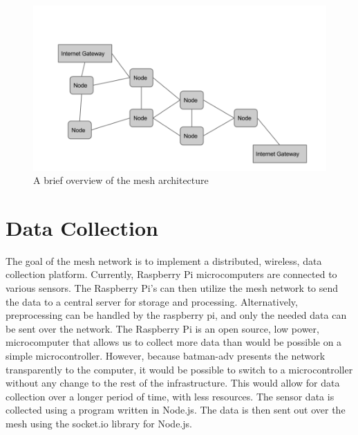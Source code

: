 \documentclass{IEEEtran}
\begin{document}
\begin{figure}
	\includegraphics[width=\textwidth]{nodearchitecture}
	\caption{A brief overview of the mesh architecture}
\end{figure}
\section{Data Collection}
The goal of the mesh network is to implement a distributed, wireless, data collection platform. Currently, Raspberry Pi microcomputers are connected to various sensors. The Raspberry Pi’s can then utilize the mesh network to send the data to a central server for storage and processing. Alternatively, preprocessing can be handled by the raspberry pi, and only the needed data can be sent over the network. The Raspberry Pi is an open source, low power, microcomputer that allows us to collect more data than would be possible on a simple microcontroller. However, because batman-adv presents the network transparently to the computer, it would be possible to switch to a microcontroller without any change to the rest of the infrastructure. This would allow for data collection over a longer period of time, with less resources. The sensor data is collected using a program written in Node.js. The data is then sent out over the mesh using the socket.io library for Node.js. 
\end{document}
